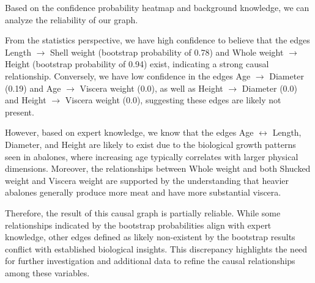 \documentclass{article}
\begin{document}
Based on the confidence probability heatmap and background knowledge, we can analyze the reliability of our graph.

From the statistics perspective, we have high confidence to believe that the edges Length $\rightarrow$ Shell weight (bootstrap probability of 0.78) and Whole weight $\rightarrow$ Height (bootstrap probability of 0.94) exist, indicating a strong causal relationship. Conversely, we have low confidence in the edges Age $\rightarrow$ Diameter (0.19) and Age $\rightarrow$ Viscera weight (0.0), as well as Height $\rightarrow$ Diameter (0.0) and Height $\rightarrow$ Viscera weight (0.0), suggesting these edges are likely not present. 

However, based on expert knowledge, we know that the edges Age $\leftrightarrow$ Length, Diameter, and Height are likely to exist due to the biological growth patterns seen in abalones, where increasing age typically correlates with larger physical dimensions. Moreover, the relationships between Whole weight and both Shucked weight and Viscera weight are supported by the understanding that heavier abalones generally produce more meat and have more substantial viscera. 

Therefore, the result of this causal graph is partially reliable. While some relationships indicated by the bootstrap probabilities align with expert knowledge, other edges defined as likely non-existent by the bootstrap results conflict with established biological insights. This discrepancy highlights the need for further investigation and additional data to refine the causal relationships among these variables.
\end{document}
